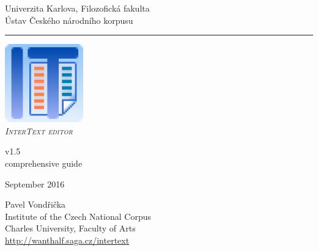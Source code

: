 \documentclass[a4paper,10pt,oneside]{book}
\newcommand{\ITeditor}{\textit{\textsc{InterText editor}}\xspace}
\begin{document}
\begin{titlepage}
\begin{center}

\begin{Large}
Univerzita Karlova, Filozofická fakulta \\
Ústav Českého národního korpusu
\end{Large}
\rule{\linewidth}{0.5mm}

\vspace*{4cm}

\begin{Huge}
\includegraphics[width=4ex]{icon.png}\\
\vspace*{1cm}
\ITeditor
\end{Huge}

\begin{huge}
v1.5\\
\medskip
comprehensive guide
\end{huge}
\bigskip

\begin{Large}
September 2016\\
\end{Large}



\bigskip

\vspace*{2.5cm}

\begin{Large}
Pavel Vondřička\\
Institute of the Czech National Corpus\\
Charles University, Faculty of Arts\\
\bigskip
\url{http://wanthalf.saga.cz/intertext}
\end{Large}

\end{center}

\end{titlepage}
\thispagestyle{empty}
\end{document}
